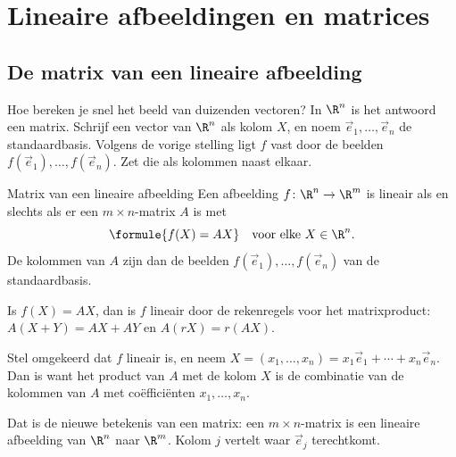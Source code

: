 \begin{oefeningen}
\end{oefeningen}

\section{Lineaire afbeeldingen en matrices}

\subsection{De matrix van een lineaire afbeelding}

Hoe bereken je snel het beeld van duizenden vectoren? In $\R^n$ is het antwoord een matrix. Schrijf een vector van $\R^n$ als kolom $X$, en noem $\vec e_1, \ldots, \vec e_n$ de standaardbasis. Volgens de vorige stelling ligt $f$ vast door de beelden $f(\vec e_1), \ldots, f(\vec e_n)$. Zet die als kolommen naast elkaar.

\begin{theorie}
\begin{stelling}{Matrix van een lineaire afbeelding}
Een afbeelding $f \colon \R^n \to \R^m$ is lineair als en slechts als er een $m \times n$-matrix $A$ is met
\[ \formule{f(X) = AX} \quad \text{voor elke } X \in \R^n . \]
De kolommen van $A$ zijn dan de beelden $f(\vec e_1), \ldots, f(\vec e_n)$ van de standaardbasis.
\end{stelling}

\begin{bewijs}
Is $f(X) = AX$, dan is $f$ lineair door de rekenregels voor het matrixproduct: $A(X + Y) = AX + AY$ en $A(rX) = r(AX)$.

Stel omgekeerd dat $f$ lineair is, en neem $X = (x_1, \ldots, x_n) = x_1\vec e_1 + \cdots + x_n\vec e_n$. Dan is
want het product van $A$ met de kolom $X$ is de combinatie van de kolommen van $A$ met coëfficiënten $x_1, \ldots, x_n$.
\end{bewijs}
\end{theorie}

Dat is de nieuwe betekenis van een matrix: een $m \times n$-matrix is een lineaire afbeelding van $\R^n$ naar $\R^m$. Kolom $j$ vertelt waar $\vec e_j$ terechtkomt.

